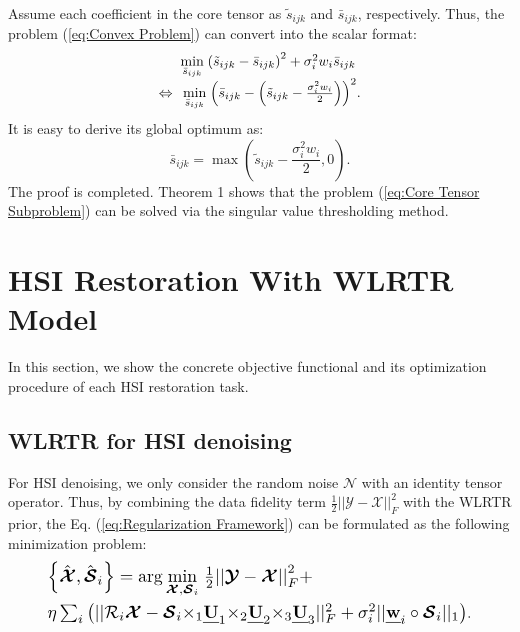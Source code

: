 \documentclass[twocolumn]{svjour3}          %
\begin{document}
    Assume each coefficient in the core tensor as ${\tilde{s}_{ijk}}$ and ${\bar{s}_{ijk}}$, respectively. Thus, the problem (\ref{eq:Convex Problem}) can convert into the scalar format:
    $$\begin{array}{l}
    {\kern 1pt} {\kern 1pt} {\kern 1pt} {\kern 1pt} {\kern 1pt} {\kern 1pt} {\kern 1pt} {\kern 1pt} {\kern 1pt} {\kern 1pt} {\kern 1pt} {\kern 1pt} {\kern 1pt} {\kern 1pt} \mathop {\min }\limits_{{{\bar s}_{ijk}}} {\kern 1pt} {\left( {{{\tilde s}_{ijk}} - {{\bar s}_{ijk}}} \right)^2} + \sigma _i^2{w_i}{{\bar s}_{ijk}}\\
    \Leftrightarrow {\kern 1pt} {\kern 1pt} {\kern 1pt} \mathop {\min }\limits_{{{\bar s}_{ijk}}} {\kern 1pt} {\left( {{{\bar s}_{ijk}} - \left( {{{\tilde s}_{ijk}} - \frac{{\sigma _i^2{w_i}}}{2}} \right)} \right)^2}.
    \end{array}$$
    It is easy to derive its global optimum as:
    $${\bar s_{ijk}} = \max \left( {{{\tilde s}_{ijk}} - \frac{{\sigma _i^2{w_i}}}{2},0} \right).$$
    The proof is completed. Theorem 1 shows that the problem (\ref{eq:Core Tensor Subproblem}) can be solved via the singular value thresholding method.

\section{HSI Restoration With WLRTR Model}
   In this section, we show the concrete objective functional and its optimization procedure of each HSI restoration task.

  \subsection{WLRTR for HSI denoising}
    For HSI denoising, we only consider the random noise ${\boldsymbol{\mathcal{N}}}$ with an identity tensor operator. Thus, by combining the data fidelity term $\frac{1}{2}||{\boldsymbol{\mathcal{Y}}} - {\boldsymbol{\mathcal{X}}}||_F^2$ with the WLRTR prior, the Eq. (\ref{eq:Regularization Framework}) can be formulated as the following minimization problem:
    \begin{equation}\label{eq:WLRTR}
    \begin{aligned}
    \setlength{\abovedisplayskip}{2pt}
    \setlength{\belowdisplayskip}{2pt}
    &\resizebox{0.55\hsize}{!}{$\left\{ {\hat{\boldsymbol{\mathcal{X}}},{{\hat{\boldsymbol{\mathcal{S}}}}_i}} \right\} = \arg \mathop {\min }\limits_{{\boldsymbol{\mathcal{X}}},{{\boldsymbol{\mathcal{S}}}_i}} {\kern 1pt} \frac{1}{2}{\rm{||}}{\boldsymbol{\mathcal{Y}}} - {\boldsymbol{\mathcal{X}}}{\rm{||}}_F^2 + $} \\
    &\resizebox{0.87\hsize}{!}{$ \eta \sum\nolimits_i {\left( {||{{\mathcal{R}}_i}{\boldsymbol{\mathcal{X}}} - {{\boldsymbol{\mathcal{S}}}_i}{ \times _1}{\textbf{\emph{U}}_1}{ \times _2}{\textbf{\emph{U}}_2}{ \times _3}{\textbf{\emph{U}}_3}||_F^2 + \sigma _i^2||{\textbf{\emph{w}}_i} \circ {{\boldsymbol{\mathcal{S}}}_i}|{|_1}} \right)}$}.
    \end{aligned}
    \end{equation}
\end{document}
